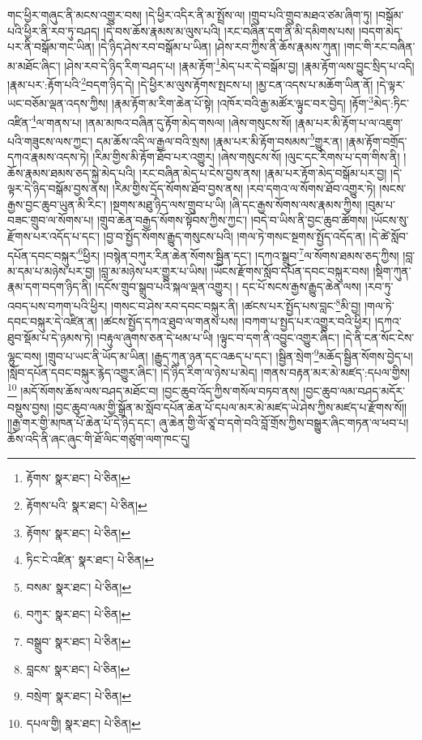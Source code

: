 གང་ཕྱིར་གཞུང་ནི་མངས་འགྱུར་བས། །དེ་ཕྱིར་འདིར་ནི་མ་སྤྲོས་ལ། །གྲུབ་པའི་གྲུབ་མཐའ་ཙམ་ཞིག་ཏུ། །བསྒོམ་པའི་ཕྱིར་ནི་རབ་ཏུ་བཤད། །དེ་བས་ཆོས་རྣམས་མ་ལུས་པའི། །རང་བཞིན་དག་ནི་མི་དམིགས་པས། །བདག་མེད་པར་ནི་བསྒོམ་གང་ཡིན། །དེ་ཉིད་ཤེས་རབ་བསྒོམ་པ་ཡིན། །ཤེས་རབ་ཀྱིས་ནི་ཆོས་རྣམས་ཀུན། །གང་གི་རང་བཞིན་མ་མཐོང་ཞིང་། །ཤེས་རབ་དེ་ཉིད་རིག་བཤད་པ། །རྣམ་རྟོག་\footnote{རྟོགས་  སྣར་ཐང་།  པེ་ཅིན། }མེད་པར་དེ་བསྒོམ་བྱ། །རྣམ་རྟོག་ལས་བྱུང་སྲིད་པ་འདི། །རྣམ་པར་:རྟོག་པའི་\footnote{རྟོགས་པའི་  སྣར་ཐང་།  པེ་ཅིན། }བདག་ཉིད་དེ། །དེ་ཕྱིར་མ་ལུས་རྟོགས་སྤངས་པ། །མྱ་ངན་འདས་པ་མཆོག་ཡིན་ནོ། །དེ་ལྟར་ཡང་བཅོམ་ལྡན་འདས་ཀྱིས། །རྣམ་རྟོག་མ་རིག་ཆེན་པོ་སྟེ། །འཁོར་བའི་རྒྱ་མཚོར་ལྟུང་བར་བྱེད། །རྟོག་\footnote{རྟོགས་  སྣར་ཐང་།  པེ་ཅིན། }མེད་:ཏིང་འཛིན་\footnote{ཏིང་ངེ་འཛིན་  སྣར་ཐང་།  པེ་ཅིན། }ལ་གནས་པ། །ནམ་མཁའ་བཞིན་དུ་རྟོག་མེད་གསལ། །ཞེས་གསུངས་སོ། །རྣམ་པར་མི་རྟོག་པ་ལ་འཇུག་པའི་གཟུངས་ལས་ཀྱང་། དམ་ཆོས་འདི་ལ་རྒྱལ་བའི་སྲས། །རྣམ་པར་མི་རྟོག་བསམས་\footnote{བསམ་  སྣར་ཐང་།  པེ་ཅིན། }གྱུར་ན། །རྣམ་རྟོག་བགྲོད་དཀའ་རྣམས་འདས་ཏེ། །རིམ་གྱིས་མི་རྟོག་ཐོབ་པར་འགྱུར། །ཞེས་གསུངས་སོ། །ལུང་དང་རིགས་པ་དག་གིས་ནི། །ཆོས་རྣམས་ཐམས་ཅད་སྐྱེ་མེད་པའི། །རང་བཞིན་མེད་པ་ངེས་བྱས་ནས། །རྣམ་པར་རྟོག་མེད་བསྒོམ་པར་བྱ། །དེ་ལྟར་དེ་ཉིད་བསྒོམ་བྱས་ནས། །རིམ་གྱིས་དྲོད་སོགས་ཐོབ་བྱས་ནས། །རབ་དགའ་ལ་སོགས་ཐོབ་འགྱུར་ཏེ། །སངས་རྒྱས་བྱང་ཆུབ་ཡུན་མི་རིང་། །སྔགས་མཐུ་ཉིད་ལས་གྲུབ་པ་ཡི། །ཞི་དང་རྒྱས་སོགས་ལས་རྣམས་ཀྱིས། །བུམ་པ་བཟང་གྲུབ་ལ་སོགས་པ། །གྲུབ་ཆེན་བརྒྱད་སོགས་སྟོབས་ཀྱིས་ཀྱང་། །བདེ་བ་ཡིས་ནི་བྱང་ཆུབ་ཚོགས། །ཡོངས་སུ་རྫོགས་པར་འདོད་པ་དང་། །བྱ་བ་སྤྱོད་སོགས་རྒྱུད་གསུངས་པའི། །གལ་ཏེ་གསང་སྔགས་སྤྱོད་འདོད་ན། །དེ་ཚེ་སློབ་དཔོན་དབང་བསྐུར་\footnote{བཀུར་  སྣར་ཐང་།  པེ་ཅིན། }ཕྱིར། །བསྙེན་བཀུར་རིན་ཆེན་སོགས་སྦྱིན་དང་། །དཀའ་སྒྲུབ་\footnote{བསྒྲུབ་  སྣར་ཐང་།  པེ་ཅིན། }ལ་སོགས་ཐམས་ཅད་ཀྱིས། །བླ་མ་དམ་པ་མཉེས་པར་བྱ། །བླ་མ་མཉེས་པར་གྱུར་པ་ཡིས། །ཡོངས་རྫོགས་སློབ་དཔོན་དབང་བསྐུར་བས། །སྡིག་ཀུན་རྣམ་དག་བདག་ཉིད་ནི། །དངོས་གྲུབ་སྒྲུབ་པའི་སྐལ་ལྡན་འགྱུར། །
དང་པོ་སངས་རྒྱས་རྒྱུད་ཆེན་ལས། །རབ་ཏུ་འབད་པས་བཀག་པའི་ཕྱིར། །གསང་བ་ཤེས་རབ་དབང་བསྐུར་ནི། །ཚངས་པར་སྤྱོད་པས་བླང་\footnote{བླངས་  སྣར་ཐང་།  པེ་ཅིན། }མི་བྱ། །གལ་ཏེ་དབང་བསྐུར་དེ་འཛིན་ན། །ཚངས་སྤྱོད་དཀའ་ཐུབ་ལ་གནས་པས། །བཀག་པ་སྤྱད་པར་འགྱུར་བའི་ཕྱིར། །དཀའ་ཐུབ་སྡོམ་པ་དེ་ཉམས་ཏེ། །བརྟུལ་ཞུགས་ཅན་དེ་ཕམ་པ་ཡི། །ལྟུང་བ་དག་ནི་འབྱུང་འགྱུར་ཞིང་། །དེ་ནི་ངན་སོང་ངེས་ལྷུང་བས། །གྲུབ་པ་ཡང་ནི་ཡོད་མ་ཡིན། །རྒྱུད་ཀུན་ཉན་དང་འཆད་པ་དང་། །སྦྱིན་སྲེག་\footnote{བསྲེག་  སྣར་ཐང་།  པེ་ཅིན། }མཆོད་སྦྱིན་སོགས་བྱེད་པ། །སློབ་དཔོན་དབང་བསྐུར་རྙེད་འགྱུར་ཞིང་། །དེ་ཉིད་རིག་ལ་ཉེས་པ་མེད། །གནས་བརྟན་མར་མེ་མཛད་:དཔལ་གྱིས།\footnote{དཔལ་གྱི།  སྣར་ཐང་།  པེ་ཅིན། } །མདོ་སོགས་ཆོས་ལས་བཤད་མཐོང་བ། །བྱང་ཆུབ་འོད་ཀྱིས་གསོལ་བཏབ་ནས། །བྱང་ཆུབ་ལམ་བཤད་མདོར་བསྡུས་བྱས། །བྱང་ཆུབ་ལམ་གྱི་སྒྲོན་མ་སློབ་དཔོན་ཆེན་པོ་དཔལ་མར་མེ་མཛད་ཡེ་ཤེས་ཀྱིས་མཛད་པ་རྫོགས་སོ།། །།རྒྱ་གར་གྱི་མཁན་པོ་ཆེན་པོ་དེ་ཉིད་དང་། ཞུ་ཆེན་གྱི་ལོ་ཙཱ་བ་དགེ་བའི་བློ་གྲོས་ཀྱིས་བསྒྱུར་ཞིང་གཏན་ལ་ཕབ་པ། ཆོས་འདི་ནི་ཞང་ཞུང་གི་ཐོ་ལིང་གཙུག་ལག་ཁང་དུ། 